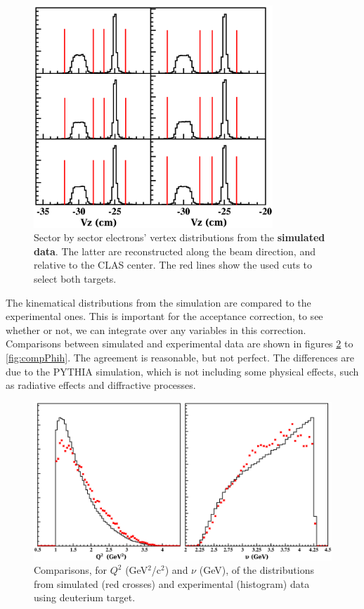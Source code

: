 \begin{figure}[tpb]
\centering
\includegraphics[width=9cm] {chap5-fig/Vertex_el_sim.png}
\caption {Sector by sector electrons' vertex distributions from the 
{\bf simulated data}. The latter are reconstructed along the beam direction, 
and relative to the CLAS center. The red lines show the used cuts to select 
both targets.}
\label{simvertex}
\end{figure}

The kinematical distributions from the simulation are compared to the 
experimental ones. This is important for the acceptance correction, to see 
whether or not, we can integrate over any variables in this correction.
Comparisons between simulated and experimental data are shown in figures 
\ref{fig:compNuQ2} to \ref{fig:compPhih}. The agreement is reasonable, but not 
perfect. The differences are due to the PYTHIA simulation, which is not including some 
physical effects, such as radiative effects and diffractive processes.

\begin{figure}[tbp]
\centering
\includegraphics[width=12cm] {chap5-fig/El_compar.png}
\caption {Comparisons, for $Q^2$ (GeV$^2$/c$^2$) and $\nu$ (GeV), of the distributions
from simulated (red crosses) and experimental (histogram) data using deuterium target.}
\label{fig:compNuQ2}
\end{figure}

